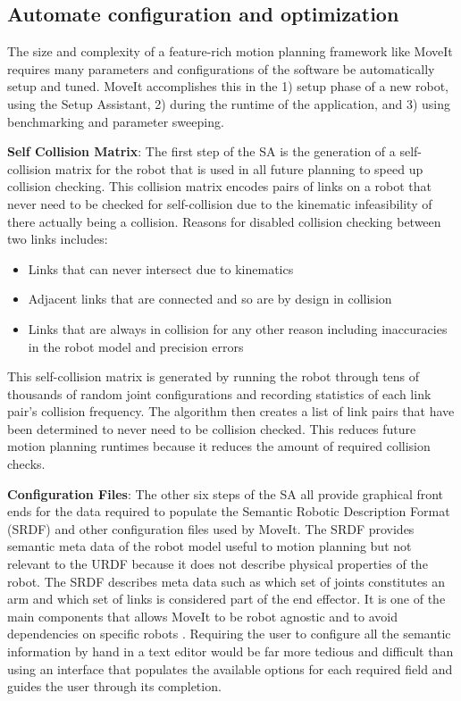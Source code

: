 \documentclass[10pt,journal,compsoc]{joser1}
\begin{document}
{%
\subsection{Automate configuration and optimization}

The size and complexity of a feature-rich motion planning framework like MoveIt requires many parameters and configurations of the software be automatically setup and tuned. MoveIt accomplishes this in the 1) setup phase of a new robot, using the Setup Assistant, 2) during the runtime of the application, and 3) using benchmarking and parameter sweeping.

{\bf Self Collision Matrix}: The first step of the SA is the generation of a self-collision matrix for the robot that is used in all future planning to speed up collision checking. This collision matrix encodes pairs of links on a robot that never need to be checked for self-collision due to the kinematic infeasibility of there actually being a collision. Reasons for disabled collision checking between two links includes:
 
\begin{itemize}
    \item Links that can never intersect due to kinematics
    \item Adjacent links that are connected and so are by design in collision
    \item Links that are always in collision for any other reason including inaccuracies in the robot model and precision errors
\end{itemize}

This self-collision matrix is generated by running the robot through tens of thousands of random joint configurations and recording statistics of each link pair's collision frequency. The algorithm then creates a list of link pairs that have been determined to never need to be collision checked. This reduces future motion planning runtimes because it reduces the amount of required collision checks.

{\bf Configuration Files}: The other six steps of the SA all provide graphical front ends for the data required to populate the Semantic Robotic Description Format (SRDF) and other configuration files used by MoveIt. The SRDF provides semantic meta data of the robot model useful to motion planning but not relevant to the URDF because it does not describe physical properties of the robot. The SRDF describes meta data such as which set of joints constitutes an arm and which set of links is considered part of the end effector. It is one of the main components that allows MoveIt to be robot agnostic and to avoid dependencies on specific robots \cite{moveit}. Requiring the user to configure all the semantic information by hand in a text editor would be far more tedious and difficult than using an interface that populates the available options for each required field and guides the user through its completion.

}
\end{document}
